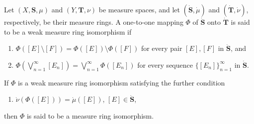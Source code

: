 Let $(X, \mathbf{S}, \mu)$ and $(Y, \mathbf{T}, \nu)$ be measure spaces, and let $(\dot{\mathbf{S}}, \dot{\mu})$ and $(\dot{\mathbf{T}}, \dot{\nu})$, respectively, be their measure rings. A one-to-one mapping $\Phi$ of $\dot{\mathbf{S}}$ onto $\dot{\mathbf{T}}$ is said to be a weak measure ring isomorphism if

\begin{enumerate}
\item[(i)] $\Phi([E] \setminus [F]) = \Phi([E]) \setminus \Phi([F])$ for every pair $[E], [F]$ in $\dot{\mathbf{S}}$, and
\item[(ii)] $\Phi\left(\bigvee_{n=1}^{\infty} [E_n]\right) = \bigvee_{n=1}^{\infty} \Phi([E_n])$ for every sequence $\{[E_n]\}_{n=1}^{\infty}$ in $\dot{\mathbf{S}}$.
\end{enumerate}

If $\Phi$ is a weak measure ring isomorphism satisfying the further condition

\begin{enumerate}
\item[(iii)] $\dot{\nu}(\Phi([E])) = \dot{\mu}([E])$, \quad $[E] \in \dot{\mathbf{S}}$,
\end{enumerate}

then $\Phi$ is said to be a measure ring isomorphism.
